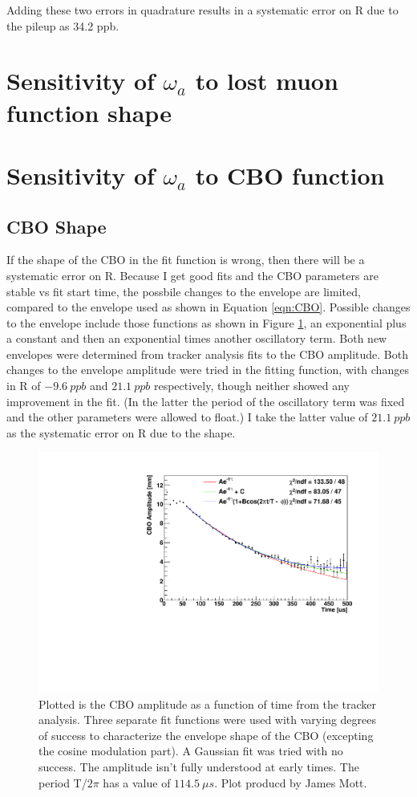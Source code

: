 	Adding these two errors in quadrature results in a systematic error on R due to the pileup as 34.2 ppb.



\section{Sensitivity of \texorpdfstring{$\omega_{a}$}{} to lost muon function shape}

\section{Sensitivity of \texorpdfstring{$\omega_{a}$}{} to CBO function}

	\subsection{CBO Shape}

		If the shape of the CBO in the fit function is wrong, then there will be a systematic error on R. Because I get good fits and the CBO parameters are stable vs fit start time, the possbile changes to the envelope are limited, compared to the envelope used as shown in Equation \ref{eqn:CBO}. Possible changes to the envelope include those functions as shown in Figure \ref{fig:CBOShapeAmplitude}, an exponential plus a constant and then an exponential times another oscillatory term. Both new envelopes were determined from tracker analysis fits to the CBO amplitude. Both changes to the envelope amplitude were tried in the fitting function, with changes in R of $\SI{-9.6}{ppb}$ and $\SI{21.1}{ppb}$ respectively, though neither showed any improvement in the fit. (In the latter the period of the oscillatory term was fixed and the other parameters were allowed to float.) I take the latter value of $\SI{21.1}{ppb}$ as the systematic error on R due to the shape.

		\begin{figure}[]
			\centering
			\includegraphics[width=.7\textwidth]{AmplFitOptions}
		    \caption[CBOShapeAmplitude]{Plotted is the CBO amplitude as a function of time from the tracker analysis. Three separate fit functions were used with varying degrees of success to characterize the envelope shape of the CBO (excepting the cosine modulation part). A Gaussian fit was tried with no success. The amplitude isn't fully understood at early times. The period T/$2\pi$ has a value of $\SI{114.5}{\mu s}$. Plot producd by James Mott.}
		    \label{fig:CBOShapeAmplitude}
		\end{figure}

